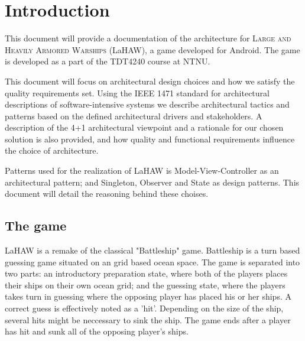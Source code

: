 \chapter{Introduction}
This document will provide a documentation of the architecture for \textsc{Large and Heavily Armored Warships} (LaHAW), a game developed for Android. The game is developed as a part of the TDT4240 course at NTNU.

This document will focus on architectural design choices and how we satisfy the quality requirements set. Using the IEEE 1471 standard for architectural descriptions of software-intensive systems\cite{IEEE1471} we describe architectural tactics and patterns based on the defined architectural drivers and stakeholders. A description of the 4+1 architectural viewpoint\cite{4+1} and a rationale for our chosen solution is also provided, and how quality and functional requirements influence the choice of architecture.

Patterns used for the realization of LaHAW is Model-View-Controller as an architectural pattern; and Singleton, Observer and State as design patterns. This document will detail the reasoning behind these choises.

	\section{The game}
	LaHAW is a remake of the classical "Battleship" game\cite{battleship}. Battleship is a turn based guessing game situated on an grid based ocean space. The game is separated into two parts: an introductory preparation state, where both of the players places their ships on their own ocean grid; and the guessing state, where the players takes turn in guessing where the opposing player has placed his or her ships. A correct guess is effectively noted as a 'hit'. Depending on the size of the ship, several hits might be neccessary to sink the ship. The game ends after a player has hit and sunk all of the opposing player's ships.